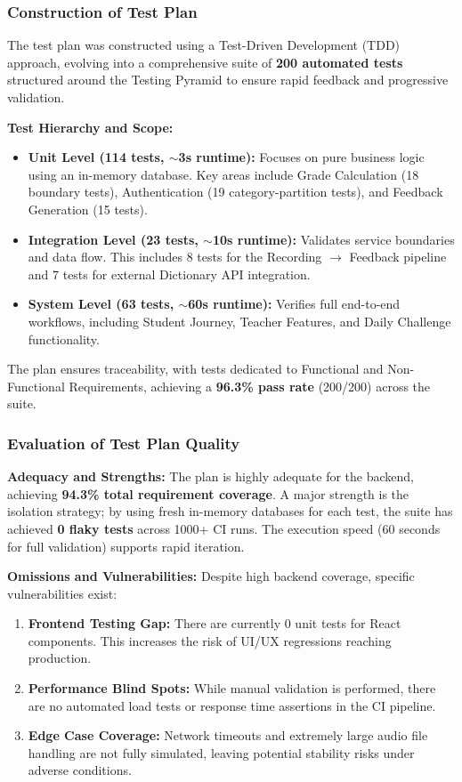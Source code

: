 \documentclass[sigconf]{acmart}
\begin{document}
\subsubsection{Construction of Test Plan}

The test plan was constructed using a Test-Driven Development (TDD) approach, evolving into a comprehensive suite of \textbf{200 automated tests} structured around the Testing Pyramid to ensure rapid feedback and progressive validation.

\textbf{Test Hierarchy and Scope:}
\begin{itemize}
    \item \textbf{Unit Level (114 tests, $\sim$3s runtime):} Focuses on pure business logic using an in-memory database. Key areas include Grade Calculation (18 boundary tests), Authentication (19 category-partition tests), and Feedback Generation (15 tests).
    \item \textbf{Integration Level (23 tests, $\sim$10s runtime):} Validates service boundaries and data flow. This includes 8 tests for the Recording $\to$ Feedback pipeline and 7 tests for external Dictionary API integration.
    \item \textbf{System Level (63 tests, $\sim$60s runtime):} Verifies full end-to-end workflows, including Student Journey, Teacher Features, and Daily Challenge functionality.
\end{itemize}

The plan ensures traceability, with tests dedicated to Functional and Non-Functional Requirements, achieving a \textbf{96.3\% pass rate} (200/200) across the suite.

\subsubsection{Evaluation of Test Plan Quality}

\textbf{Adequacy and Strengths:}
The plan is highly adequate for the backend, achieving \textbf{94.3\% total requirement coverage}. A major strength is the isolation strategy; by using fresh in-memory databases for each test, the suite has achieved \textbf{0 flaky tests} across 1000+ CI runs. The execution speed (60 seconds for full validation) supports rapid iteration.

\textbf{Omissions and Vulnerabilities:}
Despite high backend coverage, specific vulnerabilities exist:
\begin{enumerate}
    \item \textbf{Frontend Testing Gap:} There are currently 0 unit tests for React components. This increases the risk of UI/UX regressions reaching production.
    \item \textbf{Performance Blind Spots:} While manual validation is performed, there are no automated load tests or response time assertions in the CI pipeline.
    \item \textbf{Edge Case Coverage:} Network timeouts and extremely large audio file handling are not fully simulated, leaving potential stability risks under adverse conditions.
\end{enumerate}
\end{document}
